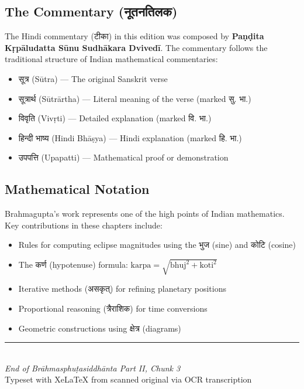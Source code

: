 \documentclass[11pt,a4paper]{article}
\newcommand{\dev}[1]{{\devanagarifont #1}}
\begin{document}
\subsection*{The Commentary (\dev{नूतनतिलक})}

The Hindi commentary (\dev{टीका}) in this edition was composed by
\textbf{Paṇḍita Kṛpāludatta Sūnu Sudhākara Dvivedī}. The commentary follows
the traditional structure of Indian mathematical commentaries:

\begin{itemize}
\item \dev{सूत्र} (Sūtra) — The original Sanskrit verse
\item \dev{सूत्रार्थ} (Sūtrārtha) — Literal meaning of the verse (marked \dev{सु. भा.})
\item \dev{विवृति} (Vivṛti) — Detailed explanation (marked \dev{वि. भा.})
\item \dev{हिन्दी भाष्य} (Hindi Bhāṣya) — Hindi explanation (marked \dev{हि. भा.})
\item \dev{उपपत्ति} (Upapatti) — Mathematical proof or demonstration
\end{itemize}

\subsection*{Mathematical Notation}

Brahmagupta's work represents one of the high points of Indian mathematics.
Key contributions in these chapters include:

\begin{itemize}
\item Rules for computing eclipse magnitudes using the \dev{भुज} (sine) and
  \dev{कोटि} (cosine)
\item The \dev{कर्ण} (hypotenuse) formula: $\text{karpa} = \sqrt{\text{bhuj}^2 + \text{koti}^2}$
\item Iterative methods (\dev{असकृत्}) for refining planetary positions
\item Proportional reasoning (\dev{त्रैराशिक}) for time conversions
\item Geometric constructions using \dev{क्षेत्र} (diagrams)
\end{itemize}

\vspace{1cm}
\begin{center}
\textcolor{rulecolor}{\rule{0.5\textwidth}{0.5pt}}\\[0.5cm]
{\small\textit{End of Brāhmasphuṭasiddhānta Part II, Chunk 3}}\\[0.3cm]
{\small Typeset with XeLaTeX from scanned original via OCR transcription}
\end{center}
\end{document}
